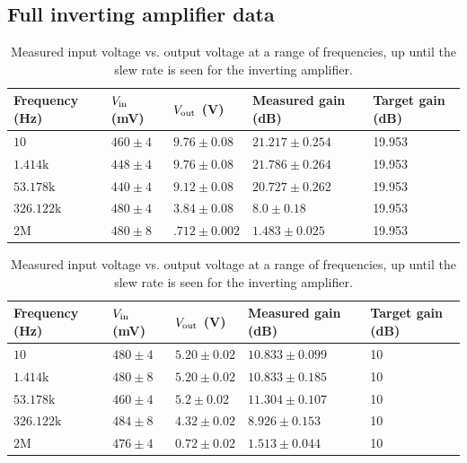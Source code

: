 \documentclass[11pt]{article}
\begin{document}
\subsection{Full inverting amplifier data}

\begin{table}[H]
	\centering
	\begin{tabular}{|l|l|l|l|l|}
	\hline
	Frequency (Hz)    & $V_{\rm in}$ (mV) & $V_{\rm out}$ (V) & Measured gain (dB) & Target gain (dB) \\
	\hline
	$10$              & $460 \pm 4$      & $9.76 \pm 0.08$   & $21.217 \pm 0.254$ & 19.953           \\
	$1.414\text{k}$   & $448 \pm 4$      & $9.76 \pm 0.08$   & $21.786 \pm 0.264$ & 19.953           \\
	$53.178\text{k}$  & $440 \pm 4$      & $9.12 \pm 0.08$   & $20.727 \pm 0.262$ & 19.953           \\
	$326.122\text{k}$ & $480 \pm 4$      & $3.84 \pm 0.08$   & $8.0 \pm 0.18$     & 19.953           \\
	$2\text{M}$       & $480 \pm 8$      & $.712 \pm 0.002$  & $1.483 \pm 0.025$  & 19.953           \\
	\hline
	\end{tabular}
	\caption{Measured input voltage vs. output voltage at a range of
	frequencies, up until the slew rate is seen for the inverting amplifier.}
\end{table}

\begin{table}[H]
	\centering
	\begin{tabular}{|l|l|l|l|l|}
	\hline
	Frequency (Hz)    & $V_{\rm in}$ (mV) & $V_{\rm out}$ (V) & Measured gain (dB) & Target gain (dB) \\
	\hline
	$10$              & $480 \pm 4$      & $5.20 \pm 0.02$   & $10.833 \pm 0.099$ & 10               \\
	$1.414\text{k}$   & $480 \pm 8$      & $5.20 \pm 0.02$   & $10.833 \pm 0.185$ & 10               \\
	$53.178\text{k}$  & $460 \pm 4$      & $5.2 \pm 0.02$    & $11.304 \pm 0.107$ & 10               \\
	$326.122\text{k}$ & $484 \pm 8$      & $4.32 \pm 0.02$   & $8.926 \pm 0.153$  & 10               \\
	$2\text{M}$       & $476 \pm 4$      & $0.72 \pm 0.02$   & $1.513 \pm 0.044$  & 10               \\
	\hline
	\end{tabular}
	\caption{Measured input voltage vs. output voltage at a range of
	frequencies, up until the slew rate is seen for the inverting amplifier.}
\end{table}
\end{document}
